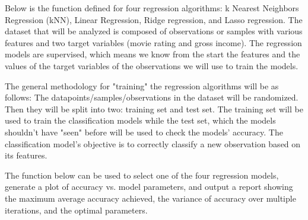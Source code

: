 \documentclass[11pt]{article}
\begin{document}
Below is the function defined for four regression algorithms: k Nearest
Neighbors Regression (kNN), Linear Regression, Ridge regression, and
Lasso regression. The dataset that will be analyzed is composed of
observations or samples with various features and two target variables
(movie rating and gross income). The regression models are supervised,
which means we know from the start the features and the values of the
target variables of the observations we will use to train the models.

The general methodology for "training" the regression algorithms will be
as follows: The datapoints/samples/observations in the dataset will be
randomized. Then they will be split into two: training set and test set.
The training set will be used to train the classification models while
the test set, which the models shouldn't have "seen" before will be used
to check the models' accuracy. The classification model's objective is
to correctly classify a new observation based on its features.

The function below can be used to select one of the four regression
models, generate a plot of accuracy vs. model parameters, and output a
report showing the maximum average accuracy achieved, the variance of
accuracy over multiple iterations, and the optimal parameters.
\end{document}
